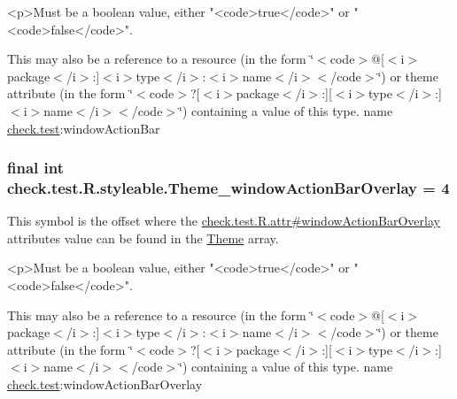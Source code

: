 \begin{DoxyVerb}      <p>Must be a boolean value, either "<code>true</code>" or "<code>false</code>".
\end{DoxyVerb}
 

This may also be a reference to a resource (in the form \char`\"{}$<$code$>$@\mbox{[}$<$i$>$package$<$/i$>$\+:\mbox{]}$<$i$>$type$<$/i$>$\+:$<$i$>$name$<$/i$>$$<$/code$>$\char`\"{}) or theme attribute (in the form \char`\"{}$<$code$>$?\mbox{[}$<$i$>$package$<$/i$>$\+:\mbox{]}\mbox{[}$<$i$>$type$<$/i$>$\+:\mbox{]}$<$i$>$name$<$/i$>$$<$/code$>$\char`\"{}) containing a value of this type.  name \hyperlink{namespacecheck_1_1test}{check.\+test}\+:window\+Action\+Bar \hypertarget{classcheck_1_1test_1_1_r_1_1styleable_adc29b18d7459f89f6028a65608a1e6c8}{}
\subsubsection[{Theme\+\_\+window\+Action\+Bar\+Overlay}]{\setlength{\rightskip}{0pt plus 5cm}final int check.\+test.\+R.\+styleable.\+Theme\+\_\+window\+Action\+Bar\+Overlay = 4\hspace{0.3cm}{\ttfamily [static]}}\label{classcheck_1_1test_1_1_r_1_1styleable_adc29b18d7459f89f6028a65608a1e6c8}
This symbol is the offset where the \hyperlink{classcheck_1_1test_1_1_r_1_1attr_a19fa3f87e323234548344c5e54c84a14}{check.\+test.\+R.\+attr\#window\+Action\+Bar\+Overlay} attribute\textquotesingle{}s value can be found in the \hyperlink{classcheck_1_1test_1_1_r_1_1styleable_acca726d02016a0cf607782ec3a436a81}{Theme} array.

\begin{DoxyVerb}      <p>Must be a boolean value, either "<code>true</code>" or "<code>false</code>".
\end{DoxyVerb}
 

This may also be a reference to a resource (in the form \char`\"{}$<$code$>$@\mbox{[}$<$i$>$package$<$/i$>$\+:\mbox{]}$<$i$>$type$<$/i$>$\+:$<$i$>$name$<$/i$>$$<$/code$>$\char`\"{}) or theme attribute (in the form \char`\"{}$<$code$>$?\mbox{[}$<$i$>$package$<$/i$>$\+:\mbox{]}\mbox{[}$<$i$>$type$<$/i$>$\+:\mbox{]}$<$i$>$name$<$/i$>$$<$/code$>$\char`\"{}) containing a value of this type.  name \hyperlink{namespacecheck_1_1test}{check.\+test}\+:window\+Action\+Bar\+Overlay \hypertarget{classcheck_1_1test_1_1_r_1_1styleable_a5abe584f47941f3243c037bca83f20fd}{}
